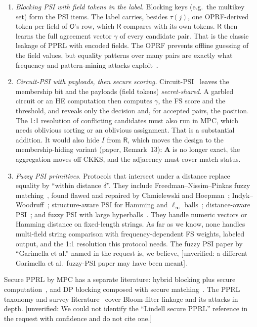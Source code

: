 \documentclass[10pt]{article}
\newcommand{\Rp}{\mathsf{R}}
\newcommand{\Op}{\mathsf{O}}
\newcommand{\bA}{\mathbf A}
\newcommand{\unverified}[1]{\textcolor{orange!70!black}{[unverified: #1]}}
\begin{document}
\begin{enumerate}[label=(c\arabic*)]
\item \emph{Blocking PSI with field tokens in the label.} Blocking keys (e.g.\ the multikey set) form the PSI items. The label carries, besides $\tau(j)$, one OPRF-derived token per field of $\Op$'s row, which $\Rp$ compares with its own tokens. $\Rp$ then learns the full agreement vector $\gamma$ of every candidate pair. That is the classic leakage of PPRL with encoded fields. The OPRF prevents offline guessing of the field values, but equality patterns over many pairs are exactly what frequency and pattern-mining attacks exploit~\cite{kuzu2011constraint,niedermeyer2014cryptanalysis,vidanage2019efficient}.
\item \emph{Circuit-PSI with payloads, then secure scoring.} Circuit-PSI~\cite{pinkas2019efficient,rindal2021vole} leaves the membership bit and the payloads (field tokens) \emph{secret-shared}. A garbled circuit or an HE computation then computes $\gamma$, the FS score and the threshold, and reveals only the decision and, for accepted pairs, the position. The 1:1 resolution of conflicting candidates must also run in MPC, which needs oblivious sorting or an oblivious assignment. That is a substantial addition. It would also hide $I$ from $\Rp$, which moves the design to the membership-hiding variant (paper, Remark~13): $\bA$ is no longer exact, the aggregation moves off CKKS, and the adjacency must cover match status.
\item \emph{Fuzzy PSI primitives.} Protocols that intersect under a distance replace equality by ``within distance $\delta$''. They include Freedman--Nissim--Pinkas fuzzy matching~\cite{freedman2004efficient}, found flawed and repaired by Chmielewski and Hoepman~\cite{chmielewski2008fuzzy}; Indyk--Woodruff~\cite{indyk2006polylogarithmic}; structure-aware PSI for Hamming and $\ell_\infty$ balls~\cite{garimella2022structure}; distance-aware PSI~\cite{chakraborti2023distance}; and fuzzy PSI with large hyperballs~\cite{vanbaarsen2024fuzzy}. They handle numeric vectors or Hamming distance on fixed-length strings. As far as we know, none handles multi-field string comparison with frequency-dependent FS weights, labeled output, and the 1:1 resolution this protocol needs. The fuzzy PSI paper by ``Garimella et al.'' named in the request is, we believe, \cite{garimella2022structure} \unverified{a different Garimella et al.\ fuzzy-PSI paper may have been meant}.
\end{enumerate}
Secure PPRL by MPC has a separate literature: hybrid blocking plus secure computation~\cite{inan2008hybrid}, and DP blocking composed with secure matching~\cite{he2017composing}. The PPRL taxonomy and survey literature~\cite{vatsalan2013taxonomy,christen2020linking} cover Bloom-filter linkage and its attacks in depth. \unverified{We could not identify the ``Lindell secure PPRL'' reference in the request with confidence and do not cite one.}
\end{document}
